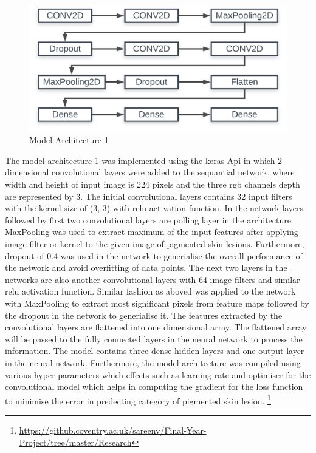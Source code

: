 \begin{figure}[!htp]
    \centering
    \includegraphics[width=\textwidth]{Images/model.png}
    \caption{Model Architecture 1}
    \label{fig:model1}
\end{figure}
The model architecture \ref{fig:model1} was implemented using the keras Api in which 2 dimensional 
convolutional layers were added to the sequantial network, where width and height of input image is 224 pixels and the three rgb channels depth 
are represented by 3. The initial convolutional layers contains 32 input filters with the kernel size of (3, 3) with relu 
activation function. In the network layers followed by first two convolutional layers are polling layer in the 
architecture MaxPooling was used to extract maximum of the input features after applying image filter or kernel 
to the given image of pigmented skin lesions. Furthermore, dropout of 0.4 was used in the network to generialise the 
overall performance of the network and avoid overfitting of data points. 
The next two layers in the networks are also another convolutional layers with 64 image filters and similar relu activation function. Similar fashion as aboved was 
applied to the network with MaxPooling to extract most significant pixels from feature maps followed by the dropout in the network to generialise it.
The features extracted by the convolutional layers are flattened into one dimensional array. The flattened array will be passed to the fully connected layers in the neural network
to process the information. The model contains three dense hidden layers and one output layer in the neural network.
Furthermore, the model architecture was compiled using various hyper-parameters which effects such as learning rate and 
optimiser for the convolutional model which helps in computing the gradient for the loss function to minimise the error in predecting 
category of pigmented skin lesion.
\footnote{\url{https://github.coventry.ac.uk/sareenv/Final-Year-Project/tree/master/Research}}
\pagebreak

